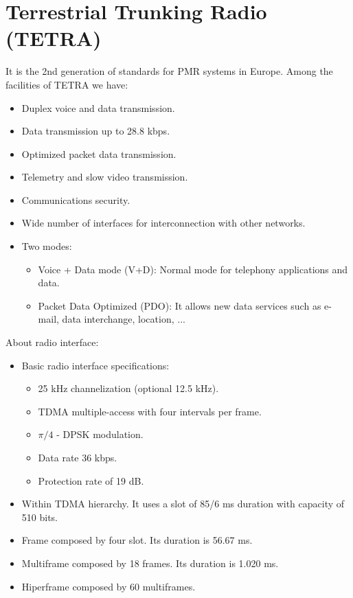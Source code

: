 \documentclass[../main.tex]{subfiles}
\begin{document}
\section{Terrestrial Trunking Radio (TETRA)}

It is the 2nd generation of standards for PMR systems in Europe. Among the facilities of TETRA we
have:

\begin{itemize}
	\item Duplex voice and data transmission.
	\item Data transmission up to 28.8 kbps.
	\item Optimized packet data transmission.
	\item Telemetry and slow video transmission.
	\item Communications security.
	\item Wide number of interfaces for interconnection with other networks.
	\item {
		Two modes:
		\begin{itemize}
			\item Voice + Data mode (V+D): Normal mode for telephony applications and data.
			\item Packet Data Optimized (PDO): It allows new data services such as e-mail, data interchange, location, ...
		\end{itemize}
	}
\end{itemize}

About radio interface:

\begin{itemize}
	\item {
		Basic radio interface specifications:
		\begin{itemize}
			\item 25 kHz channelization (optional 12.5 kHz).
			\item TDMA multiple-access with four intervals per frame.
			\item $\pi/4$ - DPSK modulation.
			\item Data rate 36 kbps.
			\item Protection rate of 19 dB.
		\end{itemize}
	}
	\item Within TDMA hierarchy. It uses a slot of 85/6 ms duration with capacity of 510 bits.
	\item Frame composed by four slot. Its duration is 56.67 ms.
	\item Multiframe composed by 18 frames. Its duration is 1.020 ms.
	\item Hiperframe composed by 60 multiframes.
\end{itemize}
\end{document}
